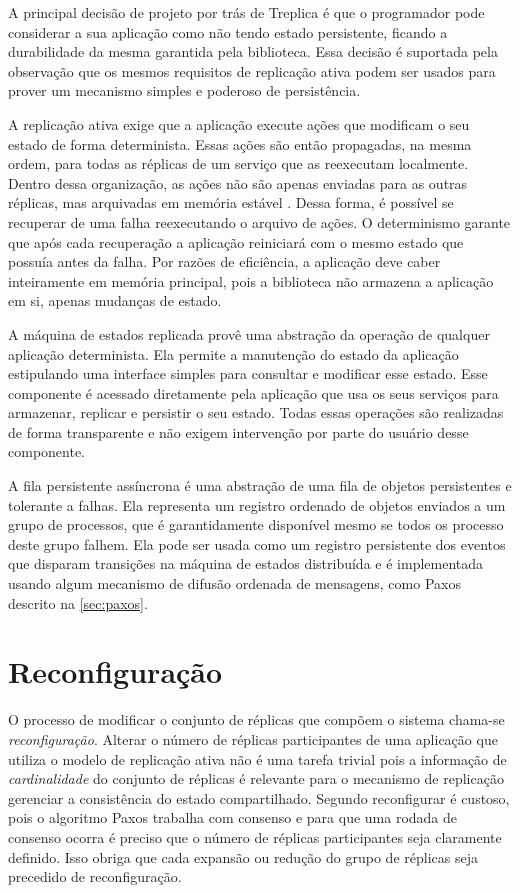 A principal decisão de projeto por trás de Treplica é que o programador pode considerar a
sua aplicação como não tendo estado persistente, ficando a durabilidade da mesma garantida
pela biblioteca. Essa decisão é suportada pela observação que os mesmos requisitos de
replicação ativa podem ser usados para prover um mecanismo simples e poderoso de
persistência.

A replicação ativa exige que a aplicação execute ações que modificam o seu estado de forma
determinista. Essas ações são então propagadas, na mesma ordem, para todas as réplicas de
um serviço que as reexecutam localmente. Dentro dessa organização, as ações não são apenas
enviadas para as outras réplicas, mas arquivadas em memória estável \cite{birrel87}. Dessa
forma, é possível se recuperar de uma falha reexecutando o arquivo de ações. O
determinismo garante que após cada recuperação a aplicação reiniciará com o mesmo estado
que possuía antes da falha. Por razões de eficiência, a aplicação deve caber inteiramente
em memória principal, pois a biblioteca não armazena a aplicação em si, apenas mudanças de
estado.

A máquina de estados replicada provê uma abstração da operação de qualquer aplicação
determinista. Ela permite a manutenção do estado da aplicação estipulando uma interface
simples para consultar e modificar esse estado. Esse componente é acessado diretamente
pela aplicação que usa os seus serviços para armazenar, replicar e persistir o seu estado.
Todas essas operações são realizadas de forma transparente e não exigem intervenção por
parte do usuário desse componente.

A fila persistente assíncrona é uma abstração de uma fila de objetos persistentes e
tolerante a falhas. Ela representa um registro ordenado de objetos enviados a um grupo de
processos, que é garantidamente disponível mesmo se todos os processo deste grupo falhem.
Ela pode ser usada como um registro persistente dos eventos que disparam transições na
máquina de estados distribuída e é implementada usando algum mecanismo de difusão ordenada
de mensagens, como Paxos descrito na \autoref{sec:paxos}.


\section{Reconfiguração}\label{sec:reconfiguracao}

O processo de modificar o conjunto de réplicas que compõem o sistema chama-se
\emph{reconfiguração}. Alterar o número de réplicas participantes de uma aplicação que
utiliza o modelo de replicação ativa não é uma tarefa trivial pois a informação de
\emph{cardinalidade} do conjunto de réplicas é relevante para o mecanismo de replicação
gerenciar a consistência do estado compartilhado. Segundo 
reconfigurar é custoso, pois o algoritmo  Paxos trabalha com consenso e para que uma
rodada de consenso ocorra é preciso que o número de réplicas participantes seja claramente
definido. Isso obriga que cada expansão ou redução do grupo de réplicas seja precedido de
reconfiguração.

